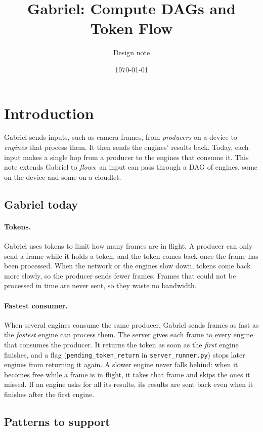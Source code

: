 \documentclass[11pt]{article}
\title{Gabriel: Compute DAGs and Token Flow}
\author{Design note}
\date{\today}
\newcommand{\code}[1]{\texttt{#1}}
\begin{document}
\maketitle
\tableofcontents
\newpage

\section{Introduction}

Gabriel sends inputs, such as camera frames, from \emph{producers} on a device
to \emph{engines} that process them. It then sends the engines' results back.
Today, each input makes a single hop from a producer to the engines that
consume it. This note extends Gabriel to \emph{flows}: an input can pass
through a DAG of engines, some on the device and some on a cloudlet.

\subsection{Gabriel today}

\paragraph{Tokens.} Gabriel uses tokens to limit how many frames are in
flight. A producer can only send a frame while it holds a token, and the token
comes back once the frame has been processed. When the network or the engines
slow down, tokens come back more slowly, so the producer sends fewer frames.
Frames that could not be processed in time are never sent, so they waste no
bandwidth.

\paragraph{Fastest consumer.} When several engines consume the same producer,
Gabriel sends frames as fast as the \emph{fastest} engine can process them.
The server gives each frame to every engine that consumes the producer. It
returns the token as soon as the \emph{first} engine finishes, and a flag
(\code{pending\_token\_return} in \code{server\_runner.py}) stops later
engines from returning it again. A slower engine never falls behind: when it
becomes
free while a frame is in flight, it takes that frame and skips the ones it
missed. If an engine asks for all its results, its results are sent back even
when it finishes after the first engine.

\subsection{Patterns to support}
\end{document}
